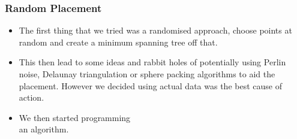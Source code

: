 \documentclass{beamer}
\begin{document}
\begin{frame}
  \frametitle{Random Placement}
    \begin{figure}

    \end{figure}
  \begin{itemize}
    \vspace{-4cm}
    \item The first thing that we tried was a randomised approach, choose points at random and create a minimum spanning tree off that.\pause
    \item This then lead to some ideas and rabbit holes of potentially using Perlin noise, Delaunay triangulation or sphere packing algorithms to aid the placement. However we decided using actual data was the best cause of action.\pause
    \item We then started programming\\ an algorithm.
  \end{itemize}
\end{frame}
\end{document}
